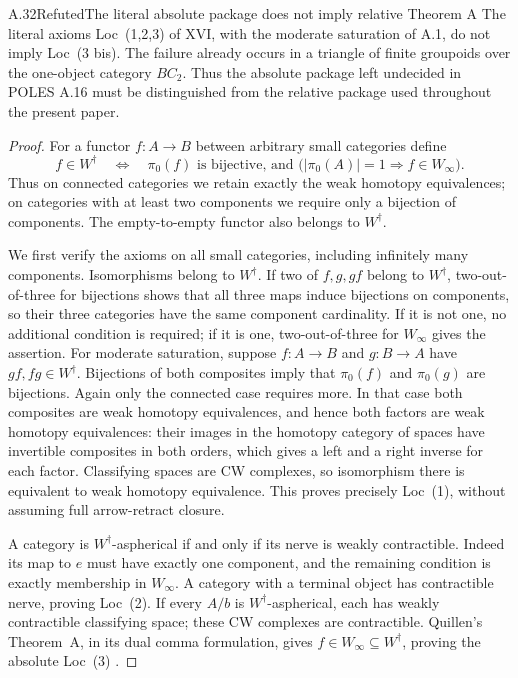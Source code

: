 \begin{claim}{A.32}{Refuted}{The literal absolute package does not imply relative Theorem A}
The literal axioms Loc~(1,2,3) of XVI, with the moderate saturation of A.1, do not imply Loc~(3 bis). The failure already occurs in a triangle of finite groupoids over the one-object category $BC_2$. Thus the absolute package left undecided in POLES A.16 must be distinguished from the relative package used throughout the present paper.
\end{claim}
\begin{proof}
For a functor $f:A\to B$ between arbitrary small categories define
\[
 f\in W^\dagger\quad\Longleftrightarrow\quad
 \pi_0(f)\text{ is bijective, and }
 \bigl(\lvert\pi_0(A)\rvert=1\Longrightarrow f\in W_\infty\bigr).
\]
Thus on connected categories we retain exactly the weak homotopy equivalences; on categories with at least two components we require only a bijection of components. The empty-to-empty functor also belongs to $W^\dagger$.

We first verify the axioms on all small categories, including infinitely many components. Isomorphisms belong to $W^\dagger$. If two of $f,g,gf$ belong to $W^\dagger$, two-out-of-three for bijections shows that all three maps induce bijections on components, so their three categories have the same component cardinality. If it is not one, no additional condition is required; if it is one, two-out-of-three for $W_\infty$ gives the assertion. For moderate saturation, suppose $f:A\to B$ and $g:B\to A$ have $gf,fg\in W^\dagger$. Bijections of both composites imply that $\pi_0(f)$ and $\pi_0(g)$ are bijections. Again only the connected case requires more. In that case both composites are weak homotopy equivalences, and hence both factors are weak homotopy equivalences: their images in the homotopy category of spaces have invertible composites in both orders, which gives a left and a right inverse for each factor. Classifying spaces are CW complexes, so isomorphism there is equivalent to weak homotopy equivalence. This proves precisely Loc~(1), without assuming full arrow-retract closure.

A category is $W^\dagger$-aspherical if and only if its nerve is weakly contractible. Indeed its map to $e$ must have exactly one component, and the remaining condition is exactly membership in $W_\infty$. A category with a terminal object has contractible nerve, proving Loc~(2). If every $A/b$ is $W^\dagger$-aspherical, each has weakly contractible classifying space; these CW complexes are contractible. Quillen's Theorem~A, in its dual comma formulation, gives $f\in W_\infty\subseteq W^\dagger$, proving the absolute Loc~(3) \citep[Theorem~A, p.~93]{BISITEQuillen1973}.


\end{proof}
